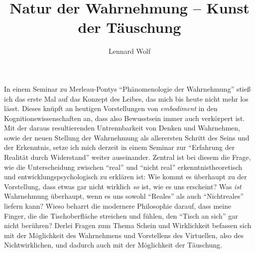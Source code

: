 \documentclass[a4paper]{article}
\date{\vspace{-2ex}}
\begin{document}
\title{Natur der Wahrnehmung – Kunst der Täuschung\vspace{-0.5ex}}

\author{Lennard Wolf}

\maketitle

In einem Seminar zu Merleau-Pontys "`Phänomenologie der Wahrnehmung"' stieß ich das erste Mal auf das Konzept des Leibes, das mich bis heute nicht mehr los lässt. Dieses knüpft an heutigen Vorstellungen von \emph{embodiment} in den Kognitionswissenschaften an, dass also Bewusstsein immer auch verkörpert ist. Mit der daraus resultierenden Untrennbarkeit von Denken und Wahrnehmen, sowie der neuen Stellung der Wahrnehmung als allerersten Schritt des Seins und der Erkenntnis, setze ich mich derzeit in einem Seminar zur "`Erfahrung der Realität durch Widerstand"' weiter auseinander. Zentral ist bei diesem die Frage, wie die Unterscheidung zwischen "`real"' und "`nicht real"' erkenntnistheoretisch und entwicklungspsychologisch zu erklären ist: Wie kommt es überhaupt zu der Vorstellung, dass etwas gar nicht wirklich \emph{so} ist, wie es uns erscheint? Was \emph{ist} Wahrnehmung überhaupt, wenn es uns sowohl "`Reales"' als auch "`Nichtreales"' liefern kann? Wieso beharrt die modernere Philosophie darauf, dass meine Finger, die die Tischoberfläche streichen und fühlen, den "`Tisch an sich"' gar nicht berühren? Derlei Fragen zum Thema Schein und Wirklichkeit befassen sich mit der Möglichkeit des Wahrnehmens und Vorstellens des Virtuellen, also des Nichtwirklichen, und dadurch auch mit der Möglichkeit der Täuschung.  
\end{document}
